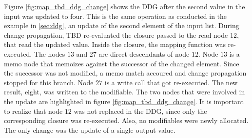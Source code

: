 Figure \ref{fig:map_tbd_ddg_change} shows the DDG after the second value in the input was updated to four. This is the same operation as conducted in the example in \ref{sec:ddg}, an update of the second element of the input list. During change propagation, TBD re-evaluated the closure passed to the read node $12$, that read the updated value. Inside the closure, the mapping function was re-executed. The nodes $13$ and $27$ are direct descendants of node $12$. Node $13$ is a memo node that memoizes against the successor of the changed element. Since the successor was not modified, a memo match accoured and change propagation stopped for this branch. Node $27$ is a write call that got re-executed. The new result, eight, was written to the modifiable. The two nodes that were involved in the update are highlighted in figure \ref{fig:map_tbd_ddg_change}. It is important to realize that node $12$ was not replaced in the DDG, since only the corresponding closure was re-executed. Also, no modifiables were newly allocated. The only change was the update of a single output value. 


